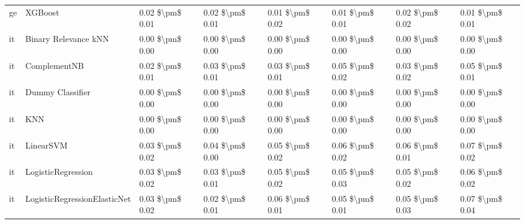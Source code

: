 \begin{tabular}{llllllll}
      ge &                         XGBoost & 0.02 \$\textbackslash pm\$ 0.01 &           0.02 \$\textbackslash pm\$ 0.01 &       0.01 \$\textbackslash pm\$ 0.02 &        0.01 \$\textbackslash pm\$ 0.01 &                         0.02 \$\textbackslash pm\$ 0.02 &     0.01 \$\textbackslash pm\$ 0.01 \\
      it &            Binary Relevance kNN & 0.00 \$\textbackslash pm\$ 0.00 &           0.00 \$\textbackslash pm\$ 0.00 &       0.00 \$\textbackslash pm\$ 0.00 &        0.00 \$\textbackslash pm\$ 0.00 &                         0.00 \$\textbackslash pm\$ 0.00 &     0.00 \$\textbackslash pm\$ 0.00 \\
      it &                    ComplementNB & 0.02 \$\textbackslash pm\$ 0.01 &           0.03 \$\textbackslash pm\$ 0.01 &       0.03 \$\textbackslash pm\$ 0.01 &        0.05 \$\textbackslash pm\$ 0.02 &                         0.03 \$\textbackslash pm\$ 0.02 &     0.05 \$\textbackslash pm\$ 0.01 \\
      it &                Dummy Classifier & 0.00 \$\textbackslash pm\$ 0.00 &           0.00 \$\textbackslash pm\$ 0.00 &       0.00 \$\textbackslash pm\$ 0.00 &        0.00 \$\textbackslash pm\$ 0.00 &                         0.00 \$\textbackslash pm\$ 0.00 &     0.00 \$\textbackslash pm\$ 0.00 \\
      it &                             KNN & 0.00 \$\textbackslash pm\$ 0.00 &           0.00 \$\textbackslash pm\$ 0.00 &       0.00 \$\textbackslash pm\$ 0.00 &        0.00 \$\textbackslash pm\$ 0.00 &                         0.00 \$\textbackslash pm\$ 0.00 &     0.00 \$\textbackslash pm\$ 0.00 \\
      it &                       LinearSVM & 0.03 \$\textbackslash pm\$ 0.02 &           0.04 \$\textbackslash pm\$ 0.00 &       0.05 \$\textbackslash pm\$ 0.02 &        0.06 \$\textbackslash pm\$ 0.02 &                         0.06 \$\textbackslash pm\$ 0.01 &     0.07 \$\textbackslash pm\$ 0.02 \\
      it &              LogisticRegression & 0.03 \$\textbackslash pm\$ 0.02 &           0.03 \$\textbackslash pm\$ 0.01 &       0.05 \$\textbackslash pm\$ 0.02 &        0.05 \$\textbackslash pm\$ 0.03 &                         0.05 \$\textbackslash pm\$ 0.02 &     0.06 \$\textbackslash pm\$ 0.02 \\
      it &    LogisticRegressionElasticNet & 0.03 \$\textbackslash pm\$ 0.02 &           0.02 \$\textbackslash pm\$ 0.01 &       0.06 \$\textbackslash pm\$ 0.01 &        0.05 \$\textbackslash pm\$ 0.01 &                         0.05 \$\textbackslash pm\$ 0.03 &     0.07 \$\textbackslash pm\$ 0.04 \\

\end{tabular}
